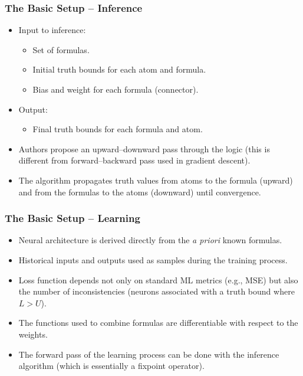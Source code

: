 \documentclass{beamer}
\begin{document}
\begin{frame}
\frametitle{The Basic Setup -- Inference}
\begin{itemize}
    \item Input to inference:
    \begin{itemize}
        \item Set of formulas.
        \item Initial truth bounds for each atom and formula.
        \item Bias and weight for each formula (connector).
    \end{itemize}
    \item Output:
    \begin{itemize}
        \item Final truth bounds for each formula and atom.
    \end{itemize}
    \item Authors propose an upward--downward pass through the logic
      (this is different from forward--backward pass used in gradient
      descent).
    \item The algorithm propagates truth values from atoms to the
      formula (upward) and from the formulas to the atoms (downward)
      until convergence.
\end{itemize}
\end{frame}

\begin{frame}
\frametitle{The Basic Setup -- Learning}
\begin{itemize}
    \item Neural architecture is derived directly from the {\em a
        priori} known formulas.
    \item Historical inputs and outputs used as samples during the
      training process.
    \item Loss function depends not only on standard ML metrics (e.g.,
      MSE) but also the number of inconsistencies (neurons associated
      with a truth bound where $L>U$).
    \item The functions used to combine formulas are differentiable
      with respect to the weights.
    \item The forward pass of the learning process can be done with
      the inference algorithm (which is essentially a fixpoint
      operator).
\end{itemize}
\end{frame}
\end{document}
